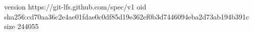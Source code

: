 version https://git-lfs.github.com/spec/v1
oid sha256:cd70aa36c2e4ae01fdae0c0df85d19e362ef0b3d7446094eba2d73ab194b391c
size 244055
